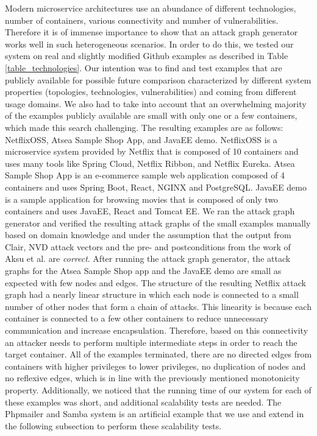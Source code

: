 Modern microservice architectures use an abundance of different technologies,  number of containers, various connectivity and number of vulnerabilities. Therefore it is of immense importance to show that an attack graph generator works well in such heterogeneous scenarios. In order to do this, we tested our system on real and slightly modified Github examples as described in Table \ref{table_technologies}. Our intention was to find and test examples that are publicly available for possible future comparison characterized by different system properties (topologies, technologies, vulnerabilities) and coming from different usage domains. We also had to take into account that an overwhelming majority of the examples publicly available are small with only one or a few containers, which made this search challenging. The resulting examples are as follows: NetflixOSS, Atsea Sample Shop App, and JavaEE demo. NetflixOSS is a microservice system provided by Netflix that is composed of 10 containers and uses many tools like Spring Cloud, Netflix Ribbon, and Netflix Eureka. Atsea Sample Shop App is an e-commerce sample web application composed of 4 containers and uses Spring Boot, React, NGINX and PostgreSQL. JavaEE demo is a sample application for browsing movies that is composed of only two containers and uses JavaEE, React and Tomcat EE. We ran the attack graph generator and verified the resulting attack graphs of the small examples manually based on domain knowledge and under the assumption that the output from Clair, NVD attack vectors \cite{booth2013national} and the pre- and postconditions from the work of Aksu et al. \cite{aksu2018automated} are \textit{correct}. After running the attack graph generator, the attack graphs for the Atsea Sample Shop app and the JavaEE demo are small as expected with few nodes and edges. The structure of the resulting Netflix attack graph had a nearly linear structure in which each node is connected to a small number of other nodes that form a chain of attacks. This linearity is because each container is connected to a few other containers to reduce unnecessary communication and increase encapsulation. Therefore, based on this connectivity an attacker needs to perform multiple intermediate steps in order to reach the target container. All of the examples terminated, there are no directed edges from containers with higher privileges to lower privileges, no duplication of nodes and no reflexive edges, which is in line with the previously mentioned monotonicity property. Additionally, we noticed that the running time of our system for each of these examples was short, and additional scalability tests are needed. The Phpmailer and Samba  system is an artificial example that we use and extend in the following subsection to perform these scalability tests.



